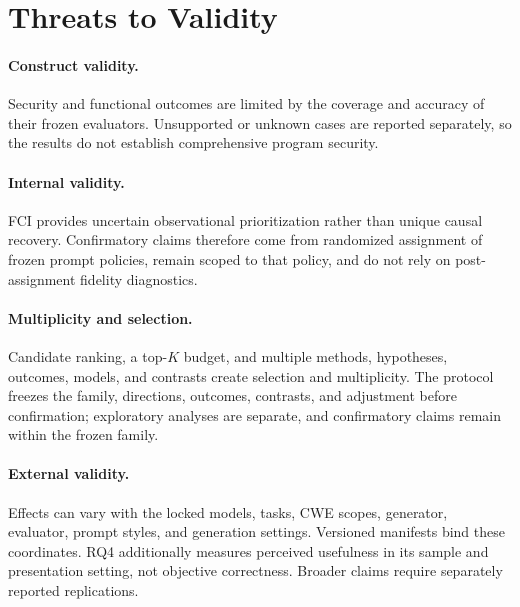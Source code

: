 \section{Threats to Validity}

\paragraph{Construct validity.}
Security and functional outcomes are limited by the coverage and accuracy of
their frozen evaluators. Unsupported or unknown cases are reported separately,
so the results do not establish comprehensive program security.

\paragraph{Internal validity.}
FCI provides uncertain observational prioritization rather than unique causal
recovery. Confirmatory claims therefore come from randomized assignment of
frozen prompt policies, remain scoped to that policy, and do not rely on
post-assignment fidelity diagnostics.

\paragraph{Multiplicity and selection.}
Candidate ranking, a top-$K$ budget, and multiple methods, hypotheses, outcomes,
models, and contrasts create selection and multiplicity. The protocol freezes
the family, directions, outcomes, contrasts, and adjustment before confirmation;
exploratory analyses are separate, and confirmatory claims remain within the
frozen family.

\paragraph{External validity.}
Effects can vary with the locked models, tasks, CWE scopes, generator,
evaluator, prompt styles, and generation settings. Versioned manifests bind
these coordinates. RQ4 additionally measures perceived usefulness in its
sample and presentation setting, not objective correctness. Broader claims
require separately reported replications.
